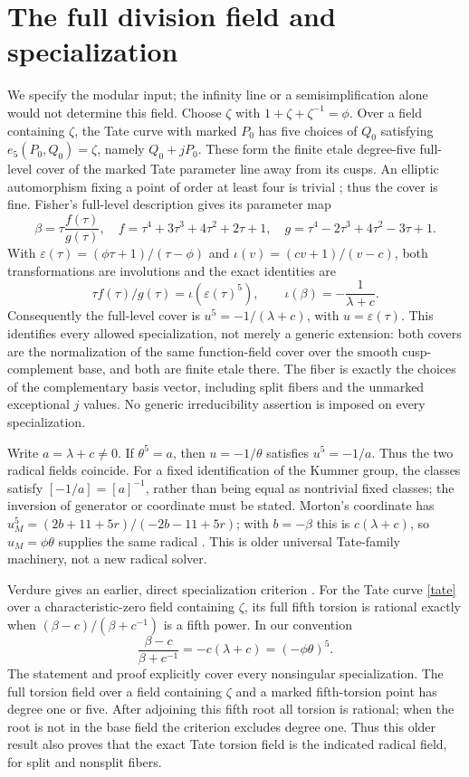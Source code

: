 \documentclass[11pt]{article}
\begin{document}
\section{The full division field and specialization}
We specify the modular input; the infinity line or a semisimplification
alone would not determine this field. Choose $\zeta$ with
$1+\zeta+\zeta^{-1}=\phi$. Over a field containing $\zeta$, the Tate
curve with marked $P_0$ has five choices of $Q_0$ satisfying
$e_5(P_0,Q_0)=\zeta$, namely $Q_0+jP_0$. These form the finite etale
degree-five full-level cover of the marked Tate parameter line away
from its cusps. An elliptic automorphism fixing a point of order at
least four is trivial \cite[Lemma 1.1]{fisher}; thus the cover is fine.
Fisher's full-level description \cite[section 2 and Lemma 3.4,
p.~194]{fisher} gives its parameter map
\[
\beta=\tau\frac{f(\tau)}{g(\tau)},\quad
f=\tau^4+3\tau^3+4\tau^2+2\tau+1,\quad
g=\tau^4-2\tau^3+4\tau^2-3\tau+1.
\]
With $\varepsilon(\tau)=(\phi\tau+1)/(\tau-\phi)$ and
$\iota(v)=(cv+1)/(v-c)$, both transformations are involutions and
the exact identities are
\begin{equation}\label{kummer}
\tau f(\tau)/g(\tau)=\iota(\varepsilon(\tau)^5),\qquad
\iota(\beta)=-\frac1{\lambda+c}.
\end{equation}
Consequently the full-level cover is $u^5=-1/(\lambda+c)$, with
$u=\varepsilon(\tau)$. This identifies every allowed specialization,
not merely a generic extension: both covers are the normalization of
the same function-field cover over the smooth cusp-complement base,
and both are finite etale there. The fiber is exactly the choices of
the complementary basis vector, including split fibers and the
unmarked exceptional $j$ values. No generic irreducibility assertion
is imposed on every specialization.

Write $a=\lambda+c\ne0$. If $\theta^5=a$, then $u=-1/\theta$ satisfies
$u^5=-1/a$. Thus the two radical fields coincide. For a fixed
identification of the Kummer group, the classes satisfy
$[-1/a]=[a]^{-1}$, rather than being equal as nontrivial fixed classes;
the inversion of generator or coordinate must be stated. Morton's
coordinate has $u_M^5=(2b+11+5r)/(-2b-11+5r)$; with $b=-\beta$ this
is $c(\lambda+c)$, so $u_M=\phi\theta$ supplies the same radical
\cite[(2.1), p.~6 of the arXiv version]{morton}. This is older
universal Tate-family machinery, not a new radical solver.

Verdure gives an earlier, direct specialization criterion
\cite[Proposition 3, Corollary 1 and Theorem 5]{verdure}. For the Tate
curve \eqref{tate} over a characteristic-zero field containing $\zeta$,
its full fifth torsion is rational exactly when
$(\beta-c)/(\beta+c^{-1})$ is a fifth power. In our convention
\[
\frac{\beta-c}{\beta+c^{-1}}=-c(\lambda+c)=(-\phi\theta)^5.
\]
The statement and proof explicitly cover every nonsingular
specialization. The full torsion field over a field containing
$\zeta$ and a marked fifth-torsion point has degree one or five.
After adjoining this fifth root all torsion is rational; when the
root is not in the base field the criterion excludes degree one.
Thus this older result also proves that the exact Tate torsion field
is the indicated radical field, for split and nonsplit fibers.
\end{document}
